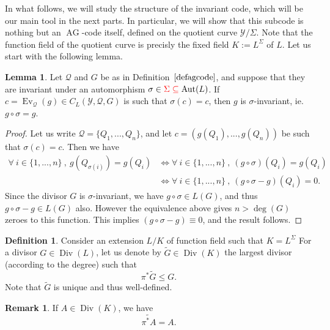 \documentclass[10pt]{article}
\theoremstyle{definition}
\newtheorem{def1}[thm]{Definition}
\newtheorem{lem1}[thm]{Lemma}
\theoremstyle{definition}
\newtheorem{rq1}[thm]{Remark}
\theoremstyle{definition}
\newcommand{\s}{\vspace{0.3cm}}
\newcommand{\su}{\subseteq}
\newcommand{\Y}{\mathcal{Y}}
\newcommand{\QR}{\mathcal{Q}}
\newcommand{\Div}{\operatorname{Div}}
\newcommand{\Aut}{\operatorname{Aut}}
\newcommand{\ag}{\operatorname{AG}}
\newcommand{\hugues}[1]{\textcolor{blue}{#1}}
\newcommand{\notehugues}[1]{\marginpar{\small\hugues{#1}}}
\begin{document}
In what follows, we will study the structure of the invariant code, which will be our main tool in the next parts. In particular, we will show that this subcode is nothing but an $\ag$-code itself, defined on the quotient curve $\Y/\Sigma$. Note that the function field of the quotient curve is precisly the fixed field $K:=L^{\Sigma}$ of $L$. Let us start with the following lemma.

\s

\begin{lem1} \label{inv}
Let $\QR$ and $G$ be as in Definition~$\ref{defagcode}$, and suppose that they are invariant under an automorphism $\sigma \in \color{red} \Sigma \su \color{black} \Aut(L)$. If $c = \operatorname{Ev}_{\QR}(g) \in C_L(\Y,\QR,G)$ is such that $\sigma(c) = c$, then $g$ is $\sigma$-invariant, ie. $g\circ \sigma = g$. 
\end{lem1}

\s

\begin{proof}
Let us write $\QR = \{Q_1,...,Q_n\}$, and let $c=(g(Q_1),...,g(Q_n))$ be such that $\sigma(c)=c$. Then we have 
\begin{align*}
\forall \ i \in \{1,...,n\} \ , \ g(Q_{\sigma(i)}) = g(Q_i) &\iff \forall \ i \in \{1,...,n\} \ , \ (g \circ \sigma)(Q_i) =g(Q_i) \\
& \iff \forall \ i \in \{1,...,n\} \ , \ (g\circ \sigma - g)(Q_i) = 0.
\end{align*}
Since the divisor $G$ is $\sigma$-invariant, we have $g \circ \sigma \in L(G)$, and thus $g\circ \sigma - g \in L(G)$ also.
However the equivalence above gives $n>\deg(G)$ zeroes to this function. This implies $(g \circ \sigma - g) \equiv 0$, and the result follows.
\end{proof}

\s

\color{purple}

\begin{def1} \label{pousseavant}
Consider an extension $L/K$ of function field such that $K=L^{\Sigma}$
For a divisor $G \in \Div(L)$, let us denote by $\tilde{G} \in \Div(K)$ the largest divisor (according to the degree) such that
\[\pi^*\tilde{G} \leq G.\]
Note that $\tilde{G}$ is unique and thus well-defined.
\end{def1} 

\s 

\begin{rq1} \label{jsp}
If $A \in \Div(K)$, we have 
\[\widetilde{\pi^*A}=A.\]
\end{rq1}
\end{document}
